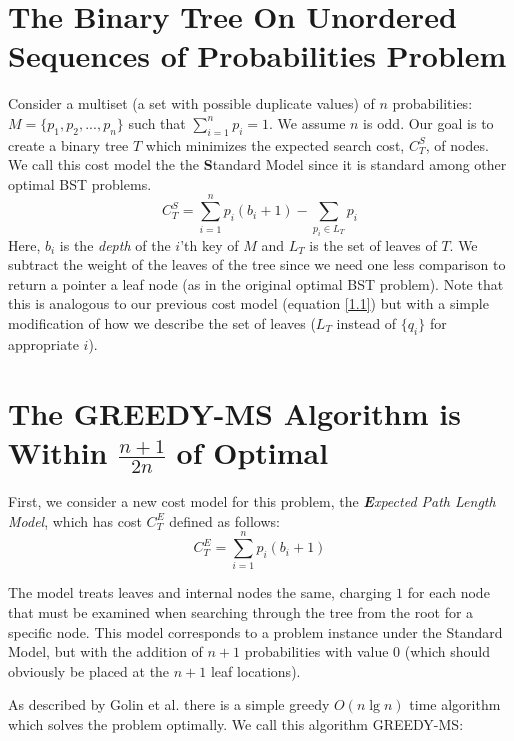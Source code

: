 \documentclass[letterpaper,12pt,titlepage,oneside,final]{book}
\theoremstyle{plain}
\begin{document}
\section{The Binary Tree On Unordered Sequences of Probabilities Problem}\label{The Multiset Binary Search Tree Problem}

 Consider a multiset (a set with possible duplicate values) of $n$ probabilities: $M = \{ p_1, p_2, ..., p_n \}$ such that $\sum\limits_{i=1}^n p_i = 1$. We assume $n$ is odd. Our goal is to create a binary tree $T$ which minimizes the expected search cost, $C^S_T$, of nodes. We call this cost model the  the \textbf{S}tandard Model since it is standard among other optimal BST problems.
\begin{equation}
C^S_T = \sum_{i=1}^{n} p_i(b_i+1) - \sum_{p_i \in L_T} p_i
\end{equation}
Here, $b_i$ is the \emph{depth} of the $i$'th key of $M$ and $L_T$ is the set of leaves of $T$. We subtract the weight of the leaves of the tree since we need one less comparison to return a pointer a leaf node (as in the original optimal BST problem). Note that this is analogous to our previous cost model (equation \ref{1.1}) but with a simple modification of how we describe the set of leaves ($L_T$ instead of $\{q_i\}$ for appropriate $i$).

\section{The GREEDY-MS Algorithm is Within $\frac{n+1}{2n}$ of Optimal}\label{GREEDY-MS}

First, we consider a new cost model for this problem, the \textit{\textbf{E}xpected Path Length Model}, which has cost $C^E_T$ defined as follows:
\begin{equation}
C^E_T = \sum_{i=1}^{n} p_i(b_i+1)
\end{equation}

The model treats leaves and internal nodes the same, charging $1$ for each node that must be examined when searching through the tree from the root for a specific node. This model corresponds to a problem instance under the Standard Model, but with the addition of $n+1$ probabilities with value $0$ (which should obviously be placed at the $n+1$ leaf locations).

As described by Golin et al. \cite{golin2012huffman} there is a simple greedy $O(n \lg n)$ time algorithm which solves the problem optimally. We call this algorithm GREEDY-MS:
\end{document}
